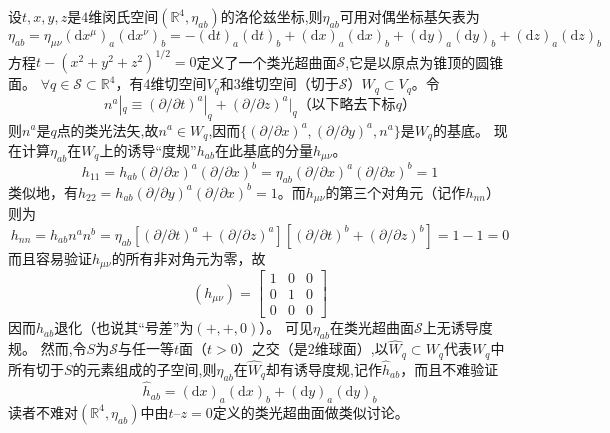 \begin{example}
	设$t, x, y, z$是$4$维闵氏空间$(\mathbb{R}^4, \eta_{ab})$的洛伦兹坐标,则$\eta_{ab}$可用对偶坐标基矢表为
	$$\eta_{ab} = \eta_{\mu\nu}(\mathrm{d}x^\mu)_a(\mathrm{d}x^\nu)_b = -(\mathrm{d}t)_a(\mathrm{d}t)_b + (\mathrm{d}x)_a(\mathrm{d}x)_b + (\mathrm{d}y)_a(\mathrm{d}y)_b + (\mathrm{d}z)_a(\mathrm{d}z)_b$$
	方程$t - (x^2 + y^2 + z^2)^{1/2} = 0$定义了一个类光超曲面$\mathscr{S}$,它是以原点为锥顶的圆锥面。
	$\forall q \in \mathscr{S} \subset \mathbb{R}^4$，有$4$维切空间$V_q$和$3$维切空间（切于$\mathscr{S}$）$W_q \subset V_q$。令
	$$n^a|_q \equiv (\partial / \partial t)^a|_q + (\partial / \partial z)^a|_q \text{（以下略去下标$q$）}$$
	则$n^a$是$q$点的类光法矢,故$n^a \in W_q$,因而$\{(\partial / \partial x)^a, (\partial / \partial y)^a, n^a\}$是$W_q$的基底。
	现在计算$\eta_{ab}$在$W_q$上的诱导``度规''$h_{ab}$在此基底的分量$h_{\mu\nu}$。
	$$h_{11} = h_{ab}(\partial / \partial x)^a(\partial / \partial x)^b = \eta_{ab}(\partial / \partial x)^a(\partial / \partial x)^b = 1$$
	类似地，有$h_{22} = h_{ab}(\partial / \partial y)^a(\partial / \partial x)^b = 1$。而$h_{\mu\nu}$的第三个对角元（记作$h_{nn}$）则为
	$$h_{nn} = h_{ab}n^an^b = \eta_{ab}[(\partial / \partial t)^a + (\partial / \partial z)^a][(\partial / \partial t)^b + (\partial / \partial z)^b] = 1 - 1 = 0$$
	而且容易验证$h_{\mu\nu}$的所有非对角元为零，故
	$$(h_{\mu\nu}) = \begin{bmatrix}
		1 & 0 & 0 \\
		0 & 1 & 0 \\
		0 & 0 & 0
	\end{bmatrix}$$
	因而$h_{ab}$退化（也说其``号差''为$(+, +, 0)$）。
	可见$\eta_{ab}$在类光超曲面$\mathscr{S}$上无诱导度规。
	然而,令$S$为$\mathscr{S}$与任一等$t$面（$t > 0$）之交（是$2$维球面）,以$\hat W_q \subset W_q$代表$W_q$中所有切于$S$的元素组成的子空间,则$\eta_{ab}$在$\hat W_q$却有诱导度规,记作$\hat h_{ab}$，而且不难验证
	$$\hat h_{ab} = (\mathrm{d}x)_a(\mathrm{d}x)_b + (\mathrm{d}y)_a(\mathrm{d}y)_b$$
	读者不难对$(\mathbb{R}^4, \eta_{ab})$中由$t \text{--} z = 0$定义的类光超曲面做类似讨论。
\end{example}
